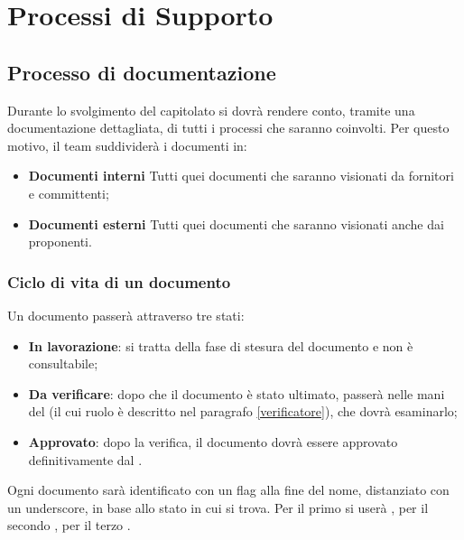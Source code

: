 \newpage
\section{Processi di Supporto}
\subsection{Processo di documentazione}
Durante lo svolgimento del capitolato si dovrà rendere conto, tramite una documentazione dettagliata, di tutti i processi che saranno coinvolti. 
Per questo motivo, il team suddividerà i documenti in:
\begin{itemize}
	\item \textbf{Documenti interni}
	\newline Tutti quei documenti che saranno visionati da fornitori e committenti;
	\item \textbf{Documenti esterni}
	\newline Tutti quei documenti che saranno visionati anche dai proponenti.
	
\end{itemize}
	
	\subsubsection{Ciclo di vita di un documento}
	Un documento passerà attraverso tre stati:
	\begin{itemize}
		\item \textbf{In lavorazione}:
		si tratta della fase di stesura del documento e non è consultabile;
		\item \textbf{Da verificare}:
		dopo che il documento è stato ultimato, passerà nelle mani del \ver{} (il cui ruolo è descritto nel paragrafo \ref{verificatore}), che dovrà esaminarlo;
		\item \textbf{Approvato}:
		dopo la verifica, il documento dovrà essere approvato definitivamente dal \RdP.
	\end{itemize}
	Ogni documento sarà identificato con un flag alla fine del nome, distanziato con un underscore, in base allo stato in cui si trova. 
	Per il primo si userà \emph{}, per il secondo \emph{}, per il terzo \emph{}.
	

